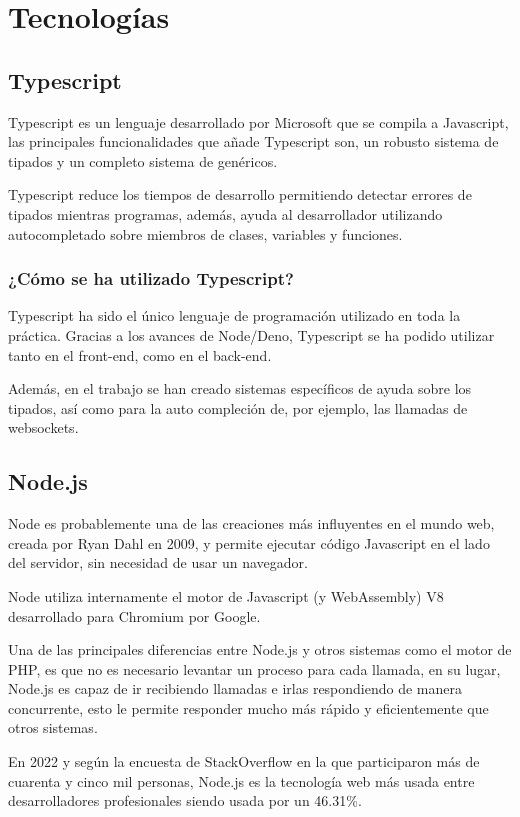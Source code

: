 \section{Tecnologías}


\subsection{Typescript}
Typescript es un lenguaje desarrollado por Microsoft que se compila a Javascript, las principales funcionalidades que añade Typescript son, un robusto sistema de tipados y un completo sistema de genéricos.

Typescript reduce los tiempos de desarrollo permitiendo detectar errores de tipados mientras programas, además, ayuda al desarrollador utilizando autocompletado sobre miembros de clases, variables y funciones.

\subsubsection{¿Cómo se ha utilizado Typescript?}
Typescript ha sido el único lenguaje de programación utilizado en toda la práctica. Gracias a los avances de Node/Deno, Typescript se ha podido utilizar tanto en el front-end, como en el back-end.

Además, en el trabajo se han creado sistemas específicos de ayuda sobre los tipados, así como para la auto compleción de, por ejemplo, las llamadas de websockets.


\subsection{Node.js}
Node es probablemente una de las creaciones más influyentes en el mundo web, creada por Ryan Dahl en 2009, y permite ejecutar código Javascript en el lado del servidor, sin necesidad de usar un navegador.

Node utiliza internamente el motor de Javascript (y WebAssembly) V8 desarrollado para Chromium por Google.

Una de las principales diferencias entre Node.js y otros sistemas como el motor de PHP, es que no es necesario levantar un proceso para cada llamada, en su lugar, Node.js es capaz de ir recibiendo llamadas e irlas respondiendo de manera concurrente, esto le permite responder mucho más rápido y eficientemente que otros sistemas.

En 2022 y según la encuesta de StackOverflow en la que participaron más de cuarenta y cinco mil personas, Node.js es la tecnología web más usada entre desarrolladores profesionales siendo usada por un 46.31\%.

